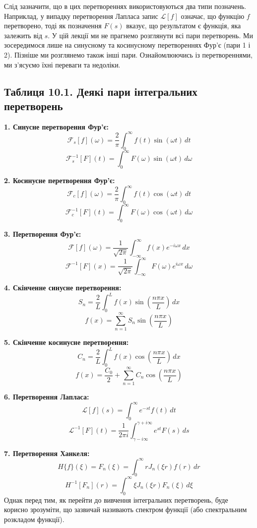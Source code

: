 Слід зазначити, що в цих перетвореннях використовуються два типи позначень. Наприклад, у випадку перетворення Лапласа запис \(\mathcal{L}[f]\) означає, що функцію \(f\) перетворено, тоді як позначення \(F(s)\) вказує, що результатом є функція, яка залежить від \(s\). У цій лекції ми не прагнемо розглянути всі пари перетворень. Ми зосередимося лише на синусному та косинусному перетвореннях Фур'є (пари 1 і 2). Пізніше ми розглянемо також інші пари. Ознайомлюючись із перетвореннями, ми з'ясуємо їхні переваги та недоліки.

\subsection{Таблиця 10.1. Деякі пари інтегральних перетворень}\label{ux442ux430ux431ux43bux438ux446ux44f-10.1.-ux434ux435ux44fux43aux456-ux43fux430ux440ux438-ux456ux43dux442ux435ux433ux440ux430ux43bux44cux43dux438ux445-ux43fux435ux440ux435ux442ux432ux43eux440ux435ux43dux44c}

\textbf{1. Синусне перетворення Фур'є:} \[
\mathcal{F}_s[f](\omega) = \frac{2}{\pi}\int_0^\infty f(t)\sin(\omega t)\,dt
\] \[
\mathcal{F}_s^{-1}[F](t) = \int_0^\infty F(\omega)\sin(\omega t)\,d\omega
\]

\textbf{2. Косинусне перетворення Фур'є:} \[
\mathcal{F}_c[f](\omega) = \frac{2}{\pi}\int_0^\infty f(t)\cos(\omega t)\,dt
\] \[
\mathcal{F}_c^{-1}[F](t) = \int_0^\infty F(\omega)\cos(\omega t)\,d\omega
\]

\textbf{3. Перетворення Фур'є:} \[
\mathcal{F}[f](\omega) = \frac{1}{\sqrt{2\pi}}\int_{-\infty}^{\infty} f(x)e^{-i\omega x}\,dx
\] \[
\mathcal{F}^{-1}[F](x) = \frac{1}{\sqrt{2\pi}}\int_{-\infty}^{\infty} F(\omega)e^{i\omega x}\,d\omega
\]

\textbf{4. Скінченне синусне перетворення:} \[
S_n = \frac{2}{L}\int_0^L f(x)\sin\left(\frac{n\pi x}{L}\right)\,dx
\] \[
f(x) = \sum_{n=1}^{\infty} S_n \sin\left(\frac{n\pi x}{L}\right)
\]

\textbf{5. Скінченне косинусне перетворення:} \[
C_n = \frac{2}{L}\int_0^L f(x)\cos\left(\frac{n\pi x}{L}\right)\,dx
\] \[
f(x) = \frac{C_0}{2} + \sum_{n=1}^{\infty} C_n \cos\left(\frac{n\pi x}{L}\right)
\]

\textbf{6. Перетворення Лапласа:} \[
\mathcal{L}[f](s) = \int_0^\infty e^{-st}f(t)\,dt
\] \[
\mathcal{L}^{-1}[F](t) = \frac{1}{2\pi i}\int_{\gamma-i\infty}^{\gamma+i\infty} e^{st}F(s)\,ds
\]

\textbf{7. Перетворення Ханкеля:} \[
H\{f\}(\xi) = F_n(\xi) = \int_0^\infty r J_n(\xi r) f(r)\,dr
\] \[
H^{-1}[F_n](r) = \int_0^\infty \xi J_n(\xi r) F_n(\xi)\,d\xi
\] Однак перед тим, як перейти до вивчення інтегральних перетворень, буде корисно зрозуміти, що зазвичай називають спектром функції (або спектральним розкладом функції).

